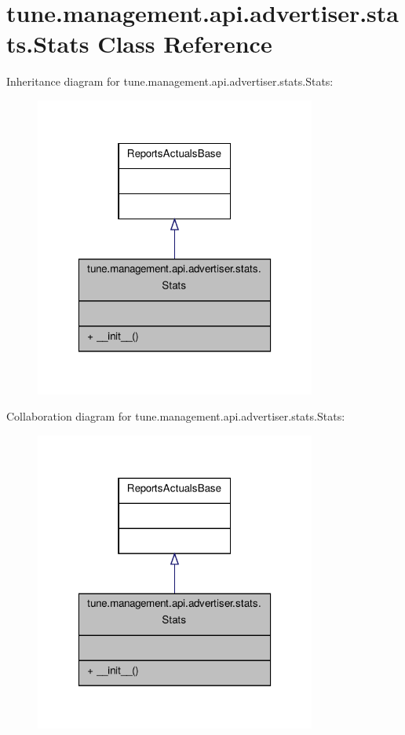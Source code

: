\hypertarget{classtune_1_1management_1_1api_1_1advertiser_1_1stats_1_1Stats}{\section{tune.\-management.\-api.\-advertiser.\-stats.\-Stats Class Reference}
\label{classtune_1_1management_1_1api_1_1advertiser_1_1stats_1_1Stats}
}


Inheritance diagram for tune.\-management.\-api.\-advertiser.\-stats.\-Stats\-:
\nopagebreak
\begin{figure}[H]
\begin{center}
\leavevmode
\includegraphics[width=262pt]{classtune_1_1management_1_1api_1_1advertiser_1_1stats_1_1Stats__inherit__graph}
\end{center}
\end{figure}


Collaboration diagram for tune.\-management.\-api.\-advertiser.\-stats.\-Stats\-:
\nopagebreak
\begin{figure}[H]
\begin{center}
\leavevmode
\includegraphics[width=262pt]{classtune_1_1management_1_1api_1_1advertiser_1_1stats_1_1Stats__coll__graph}
\end{center}
\end{figure}
